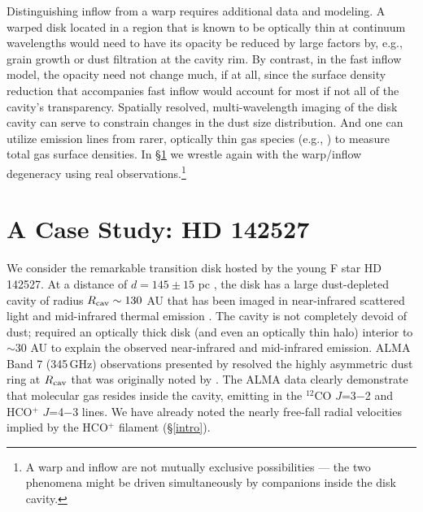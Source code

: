 Distinguishing inflow from a warp requires additional data and modeling.  A 
warped disk located in a region that is known to be optically thin at continuum 
wavelengths would need to have its opacity be reduced by large factors by, 
e.g., grain growth or dust filtration at the cavity rim.  By contrast, in the 
fast inflow model, the opacity need not change much, if at all, since the 
surface density reduction that accompanies fast inflow would account for most 
if not all of the cavity's transparency.  Spatially resolved, multi-wavelength 
imaging of the disk cavity can serve to constrain changes in the dust size
distribution.  And one can utilize emission lines from rarer, optically thin 
gas species (e.g., \citealt{bruderer13}) to measure total gas surface 
densities.  In \S\ref{sec:prospects} we wrestle
again with the warp/inflow degeneracy 
using real observations.\footnote{A warp and inflow are not mutually 
exclusive possibilities --- the two phenomena might be driven simultaneously by 
companions inside the disk cavity.}


\section{A Case Study: HD 142527} \label{sec:prospects}

We consider the remarkable transition disk hosted by the young F star HD 
142527.  At a distance of $d=145 \pm 15$ pc \citep{verhoeff11}, the disk has a 
large dust-depleted cavity of radius $R_{\rm cav} \sim 130$ AU that has been 
imaged in near-infrared scattered light 
\citep{fukagawa06,casassus12,rameau12,canovas13} and mid-infrared thermal 
emission \citep{fujiwara06,verhoeff11}.  The cavity is not completely devoid of 
dust; \citet{verhoeff11} required an optically thick disk (and even an 
optically thin halo) interior to $\sim$30 AU to explain the observed 
near-infrared and mid-infrared emission.  ALMA Band 7 (345\,GHz) observations 
presented by \citet{casassus13} resolved the highly asymmetric dust ring at 
$R_{\rm cav}$ that was originally noted by \citet{ohashi08}.  The ALMA data 
clearly demonstrate that molecular gas resides inside the cavity, emitting in
the $^{12}$CO $J$=3$-$2 and HCO$^+$ $J$=4$-$3 lines.  We have already noted the 
nearly free-fall radial velocities implied by the HCO$^+$ filament 
(\S\ref{intro}).

